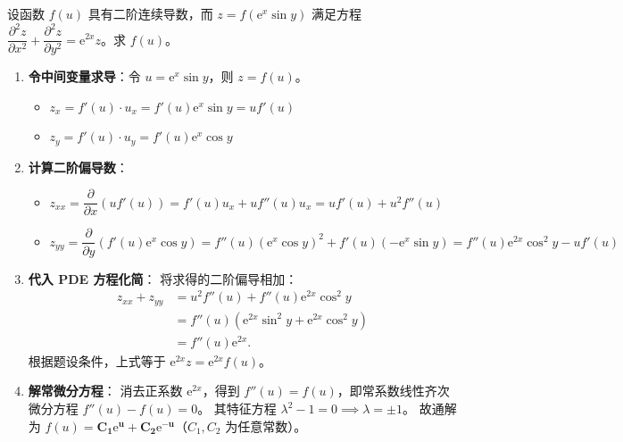 \documentclass[lang=cn,11pt]{elegantbook}
\begin{document}

\begin{exercise}
设函数 $f(u)$ 具有二阶连续导数，而 $z=f(\mathrm{e}^x\sin y)$ 满足方程 $\dfrac{\partial^2 z}{\partial x^2}+\dfrac{\partial^2 z}{\partial y^2}=\mathrm{e}^{2x}z$。求 $f(u)$。
\end{exercise}

\begin{solution}
\begin{enumerate}
  \item \textbf{令中间变量求导}：令 $u = \mathrm{e}^x\sin y$，则 $z = f(u)$。
  \begin{itemize}
    \item $z_x = f'(u) \cdot u_x = f'(u) \mathrm{e}^x\sin y = u f'(u)$
    \item $z_y = f'(u) \cdot u_y = f'(u) \mathrm{e}^x\cos y$
  \end{itemize}
  
  \item \textbf{计算二阶偏导数}：
  \begin{itemize}
    \item $z_{xx} = \dfrac{\partial}{\partial x}(u f'(u)) = f'(u) u_x + u f''(u) u_x = u f'(u) + u^2 f''(u)$
    \item $z_{yy} = \dfrac{\partial}{\partial y}(f'(u) \mathrm{e}^x\cos y) = f''(u) (\mathrm{e}^x\cos y)^2 + f'(u) (-\mathrm{e}^x\sin y) = f''(u) \mathrm{e}^{2x}\cos^2 y - u f'(u)$
  \end{itemize}
  
  \item \textbf{代入 PDE 方程化简}：
  将求得的二阶偏导相加：
  \begin{align*}
  z_{xx} + z_{yy} &= u^2 f''(u) + f''(u) \mathrm{e}^{2x}\cos^2 y \\[4pt]
  &= f''(u)(\mathrm{e}^{2x}\sin^2 y + \mathrm{e}^{2x}\cos^2 y) \\[4pt]
  &= f''(u)\mathrm{e}^{2x}.
  \end{align*}
  根据题设条件，上式等于 $\mathrm{e}^{2x}z = \mathrm{e}^{2x}f(u)$。
  
  \item \textbf{解常微分方程}：
  消去正系数 $\mathrm{e}^{2x}$，得到 $f''(u) = f(u)$，即常系数线性齐次微分方程 $f''(u) - f(u) = 0$。
  其特征方程 $\lambda^2 - 1 = 0 \implies \lambda = \pm 1$。
  故通解为 $f(u) = \mathbf{C_1 \mathrm{e}^u + C_2 \mathrm{e}^{-u}}$（$C_1, C_2$ 为任意常数）。
\end{enumerate}
\end{solution}
\end{document}
